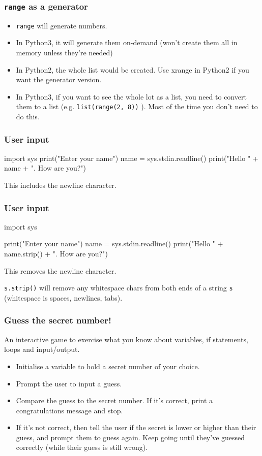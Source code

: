 \documentclass{beamer}
\begin{document}
\begin{frame}
\frametitle{\texttt{range} as a generator}
\begin{itemize}
\item \texttt{range} will generate numbers. 
\item In Python3, it will generate them on-demand (won't create them all
in memory unless they're needed)
\item In Python2, the whole list would be created. Use xrange in
  Python2 if you want the generator version.
\item In Python3, if you want to see the whole lot as a list, you need
  to convert them to a list (e.g. \texttt{list(range(2, 8))} ). Most of the
  time you don't need to do this.
\end{itemize} 
\end{frame}

\begin{frame}[fragile]
\frametitle{User input}
\begin{code}
import sys
print("Enter your name")
name = sys.stdin.readline()
print("Hello " + name + ". How are you?")
\end{code}
This includes the newline character.
\end{frame}

\begin{frame}[fragile]
\frametitle{User input}
\begin{code}
import sys

print("Enter your name")
name = sys.stdin.readline()
print("Hello " + name.strip() + ". How are you?")
\end{code}
This removes the newline character.

\texttt{s.strip()} will remove any whitespace chars from both ends of a
string \texttt{s} (whitespace is spaces, newlines, tabs).
\end{frame}


\begin{frame}
\frametitle{Guess the secret number!}
An interactive game to exercise what you know about
variables, if statements, loops and input/output.
\begin{itemize}
\item Initialise a variable to hold a secret number of your
choice.
\item Prompt the user to input a guess.
\item Compare the guess to the secret number. If it's
correct, print a congratulations message and stop.
\item If it's not correct, then tell the user if the secret is
lower or higher than their guess, and prompt them to
guess again. Keep going until they've guessed
correctly (while their guess is still wrong).
\end{itemize}
\end{frame}
\end{document}
